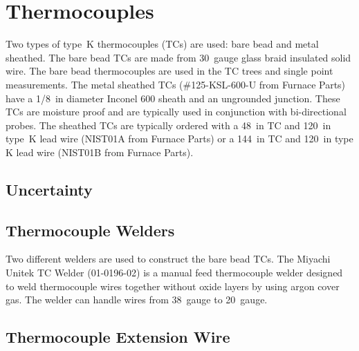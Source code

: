 \documentclass[11pt,oneside]{book}
\begin{document}
\chapter{Thermocouples}
\label{chap:thermocouple}

Two types of type~K thermocouples (TCs) are used: bare bead and metal sheathed. The bare bead TCs are made from 30~gauge glass braid insulated solid wire. The bare bead thermocouples are used in the TC trees and single point measurements. The metal sheathed TCs (\#125-KSL-600-U from Furnace Parts) have a 1/8~in diameter Inconel 600 sheath and an ungrounded junction. These TCs are moisture proof and are typically used in conjunction with bi-directional probes. The sheathed TCs are typically ordered with a 48~in TC and 120~in type~K lead wire (NIST01A from Furnace Parts) or a 144~in TC and 120~in type K lead wire (NIST01B from Furnace Parts).

\section{Uncertainty}


\section{Thermocouple Welders}

Two different welders are used to construct the bare bead TCs. The Miyachi Unitek TC Welder (01-0196-02) is a manual feed thermocouple welder designed to weld thermocouple wires together without oxide layers by using argon cover gas. The welder can handle wires from 38~gauge to 20~gauge. 

\section{Thermocouple Extension Wire}
\end{document}
